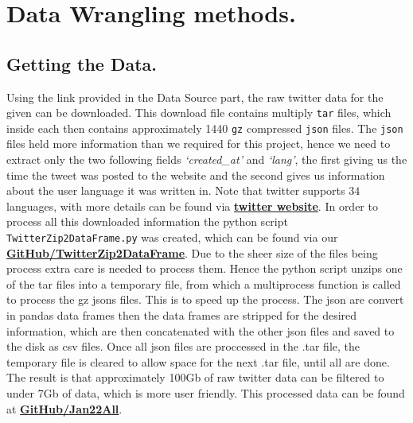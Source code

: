 \documentclass[10pt]{article}
\begin{document}
\section{Data Wrangling methods.}
\subsection{Getting the Data.}
Using the link provided in the Data Source part, the raw twitter data for the given can be
downloaded. This download file contains multiply \texttt{tar} files, which inside each
then contains approximately 1440 \texttt{gz} compressed \texttt{json} files. The
\texttt{json} files held more information than we required for this project, hence we need
to extract only the two following fields \emph{`created\_at'} and \emph{`lang'}, the first
giving us the
time the tweet was posted to the website and the second gives us information about the
user language it was written in. Note that twitter supports $34$ languages, with more
details can be found via
\href{https://developer.twitter.com/en/docs/twitter-for-websites/supported-languages}{\color{blue}
\textbf{twitter website}}.
In order to process all this downloaded information the python script
\texttt{TwitterZip2DataFrame.py} was created, which can be found via our
\href{https://github.com/JamesZor/data-WranglingProject/blob/main/TwitterZip2DataFrame.py}{\color{blue}\textbf{GitHub/TwitterZip2DataFrame}}.
Due to the sheer size of the files being process extra care is needed to process them.
Hence the python script unzips one of the tar files into a temporary file, from which a
multiprocess function is called to process the gz jsons files. 
This is to speed up the process. The json are convert in pandas data frames then the data frames
are stripped for the desired information, which are then concatenated with the other json
files and saved to the disk as csv files.  
Once all json files are proccessed in the .tar file, the temporary file is cleared to allow space 
for the next .tar file, until all are done. The result is that approximately 100Gb of raw twitter 
data can be filtered to under 7Gb of data, which is more user friendly. This processed
data can be found at
\href{https://github.com/JamesZor/data-WranglingProject/tree/main/dataSets/jan22All}{\color{blue}
\textbf{GitHub/Jan22All}}.
\end{document}
